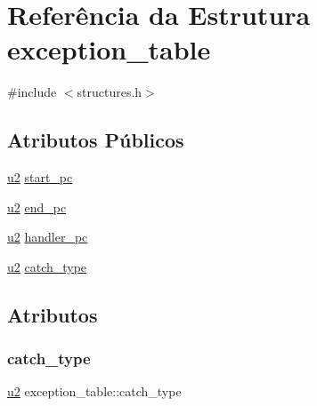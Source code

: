 \hypertarget{structexception__table}{}\section{Referência da Estrutura exception\+\_\+table}
\label{structexception__table}


{\ttfamily \#include $<$structures.\+h$>$}

\subsection*{Atributos Públicos}
\begin{DoxyCompactItemize}
\item 
\hyperlink{lista__operandos_8h_a732cde1300aafb73b0ea6c2558a7a54f}{u2} \hyperlink{structexception__table_a63da93a2b0f5dc61b3a158a0c7384602}{start\+\_\+pc}
\item 
\hyperlink{lista__operandos_8h_a732cde1300aafb73b0ea6c2558a7a54f}{u2} \hyperlink{structexception__table_aeb4c86c92f02d6fccd52a0a9be9c5dac}{end\+\_\+pc}
\item 
\hyperlink{lista__operandos_8h_a732cde1300aafb73b0ea6c2558a7a54f}{u2} \hyperlink{structexception__table_a8fe6fb5063598ad0d48aab5e617d6a35}{handler\+\_\+pc}
\item 
\hyperlink{lista__operandos_8h_a732cde1300aafb73b0ea6c2558a7a54f}{u2} \hyperlink{structexception__table_ade50b30a987f3d3452a6de69eee0ada5}{catch\+\_\+type}
\end{DoxyCompactItemize}


\subsection{Atributos}
\mbox{\label{structexception__table_ade50b30a987f3d3452a6de69eee0ada5}} 
\subsubsection{\texorpdfstring{catch\+\_\+type}{catch\_type}}
{\footnotesize\ttfamily \hyperlink{lista__operandos_8h_a732cde1300aafb73b0ea6c2558a7a54f}{u2} exception\+\_\+table\+::catch\+\_\+type}

\mbox{\label{structexception__table_aeb4c86c92f02d6fccd52a0a9be9c5dac}} 
